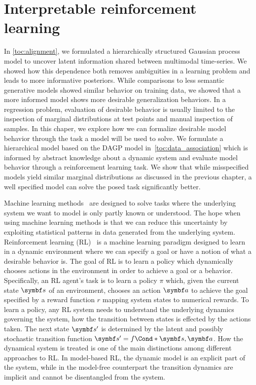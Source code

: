 \chapter{Interpretable reinforcement learning}
\label{toc:interpretable_rl}
In \cref{toc:alignment}, we formulated a hierarchically structured Gaussian process model to uncover latent information shared between multimodal time-series.
We showed how this dependence both removes ambiguities in a learning problem and leads to more informative posteriors.
While comparisons to less semantic generative models showed similar behavior on training data, we showed that a more informed model shows more desirable generalization behaviors.
In a regression problem, evaluation of desirable behavior is usually limited to the inspection of marginal distributions at test points and manual inspection of samples.
In this chaper, we explore how we can formalize desirable model behavior through the task a model will be used to solve.
We formulate a hierarchical model based on the DAGP model in~\cref{toc:data_association} which is informed by abstract knowledge about a dynamic system and evaluate model behavior through a reinforcement learning task.
We show that while misspecified models yield similar marginal distributions as discussed in the previous chapter, a well specified model can solve the posed task significantly better.

Machine learning methods~\parencite{shalev-shwartz_understanding_2014} are designed to solve tasks where the underlying system we want to model is only partly known or understood.
The hope when using machine learning methods is that we can reduce this uncertainty by exploiting statistical patterns in data generated from the underlying system.
Reinforcement learning (RL)~\parencite{sutton_reinforcement_2018} is a machine learning paradigm designed to learn in a dynamic environment where we can specify a goal or have a notion of what a desirable behavior is.
The goal of RL is to learn a policy which dynamically chooses actions in the environment in order to achieve a goal or a behavior.
Specifically, an RL agent's task is to learn a policy $\pi$ which, given the current state $\mat{s}$ of an environment, chooses an action $\mat{a}$ to achieve the goal specified by a reward function $r$ mapping system states to numerical rewards.
To learn a policy, any RL system needs to understand the underlying dynamics governing the system, how the transition between states is effected by the actions taken.
The next state $\mat{s}^\prime$ is determined by the latent and possibly stochastic transition function $\mat{s}^\prime = \Fun*{f}{\mat{s}, \mat{a}}$.
How the dynamical system is treated is one of the main distinctions among different approaches to RL.
In model-based RL, the dynamic model is an explicit part of the system, while in the model-free counterpart the transition dynamics are implicit and cannot be disentangled from the system.


